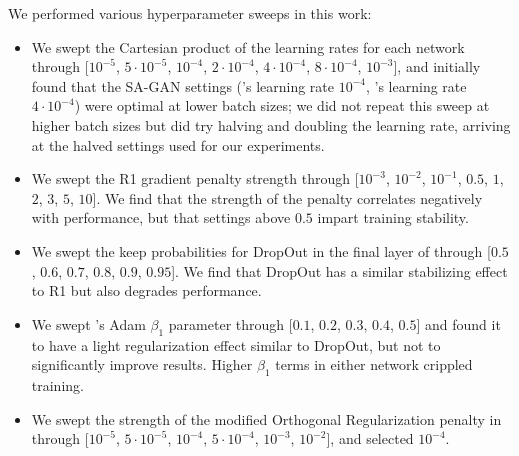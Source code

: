 We performed various hyperparameter sweeps in this work:
\begin{itemize}
\item We swept the Cartesian product of the learning rates for each network through [$10^{-5}$, $5\cdot10^{-5}$, $10^{-4}$, $2\cdot10^{-4}$, $4\cdot10^{-4}$, $8\cdot10^{-4}$, $10^{-3}$], and initially found that the SA-GAN settings (\gen{}'s learning rate $10^{-4}$, \discr{}'s learning rate $4\cdot10^{-4}$) were optimal at lower batch sizes; we did not repeat this sweep at higher batch sizes but did try halving and doubling the learning rate, arriving at the halved settings used for our experiments.

\item We swept the R1 gradient penalty strength through [$10^{-3}$, $10^{-2}$, $10^{-1}$, $0.5$, $1$, $2$, $3$, $5$, $10$]. We find that the strength of the penalty correlates negatively with performance, but that settings above $0.5$ impart training stability.

\item We swept the keep probabilities for DropOut in the final layer of \discr{} through [$0.5$, $0.6$, $0.7$, $0.8$, $0.9$, $0.95$]. We find that DropOut has a similar stabilizing effect to R1 but also degrades performance.

\item We swept \discr{}'s Adam $\beta_1$ parameter through [$0.1$, $0.2$, $0.3$, $0.4$, $0.5$] and found it to have a light regularization effect similar to DropOut, but not to significantly improve results. Higher $\beta_1$ terms in either network crippled training.

\item We swept the strength of the modified Orthogonal Regularization penalty in \gen{} through [$10^{-5}$, $5\cdot10^{-5}$, $10^{-4}$, $5\cdot10^{-4}$, $10^{-3}$, $10^{-2}$], and selected $10^{-4}$.

\end{itemize}



